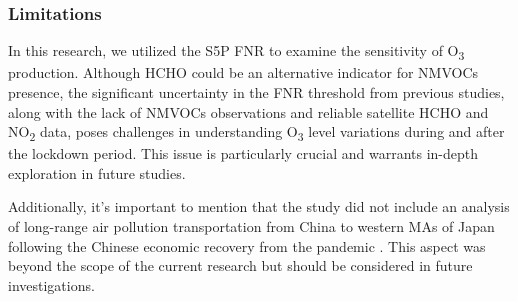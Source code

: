 \subsubsection{Limitations}
In this research, we utilized the S5P FNR to examine the sensitivity of O\textsubscript{3} production. Although HCHO could be an alternative indicator for NMVOCs presence, the significant uncertainty in the FNR threshold from previous studies, along with the lack of NMVOCs observations and reliable satellite HCHO and NO\textsubscript{2} data, poses challenges in understanding O\textsubscript{3} level variations during and after the lockdown period. This issue is particularly crucial and warrants in-depth exploration in future studies. \par
Additionally, it's important to mention that the study did not include an analysis of long-range air pollution transportation from China to western MAs of Japan following the Chinese economic recovery from the pandemic \citep{itahashi2022returning}. This aspect was beyond the scope of the current research but should be considered in future investigations. \par

